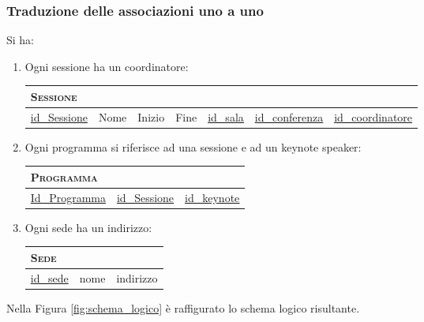 \subsubsection{Traduzione delle associazioni uno a uno}
Si ha:
\begin{enumerate}
	\item Ogni sessione ha un coordinatore:

		\begin{tabular}{|l|l|l|l|l|l|l|}
			\multicolumn{7}{l}{\textsc{Sessione}} \\ \hline
			\underline{id\_Sessione} & Nome & Inizio & Fine & \underline{\underline{id\_sala}}& \underline{\underline{id\_conferenza}} & \underline{\underline{id\_coordinatore}} \\ \hline
		\end{tabular}

\item Ogni programma si riferisce ad una sessione e ad un keynote speaker:

	\begin{tabular}{|l|l|l|}
		\multicolumn{1}{l}{\textsc{Programma}} \\ \hline
		\underline{Id\_Programma} & \underline{\underline{id\_Sessione}} & \underline{\underline{id\_keynote}}\\ \hline
	\end{tabular}
\item Ogni sede ha un indirizzo:

	\begin{tabular}{|l|l|l|}
		\multicolumn{3}{l}{\textsc{Sede}} \\ \hline
		\underline{id\_sede} & nome & indirizzo \\ \hline
	\end{tabular}
\end{enumerate}
Nella Figura \ref{fig:schema_logico} è raffigurato lo schema logico risultante.
